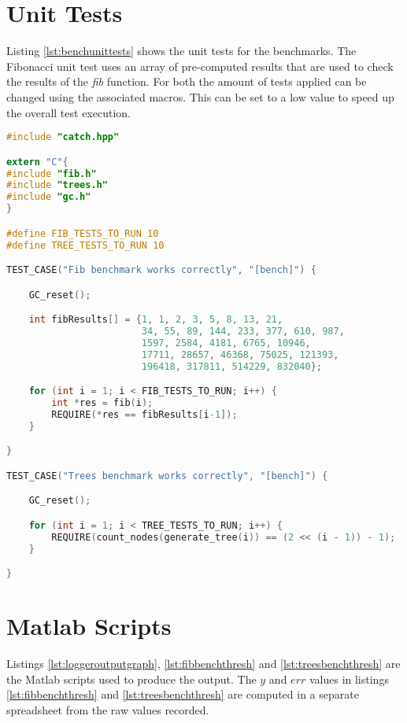 \documentclass[12pt,a4paper,twoside,openright]{report}
\begin{document}
\section{Unit Tests}

Listing \ref{lst:benchunittests} shows the unit tests for the benchmarks. The Fibonacci unit test uses an array of pre-computed results that are used to check the results of the \emph{fib} function. For both the amount of tests applied can be changed using the associated macros. This can be set to a low value to speed up the overall test execution.

\begin{figure*}
\begin{lstlisting}[language=C, caption=Benchmark unit tests, label={lst:benchunittests}]
#include "catch.hpp"

extern "C"{
#include "fib.h"
#include "trees.h"
#include "gc.h"
}

#define FIB_TESTS_TO_RUN 10
#define TREE_TESTS_TO_RUN 10

TEST_CASE("Fib benchmark works correctly", "[bench]") {

    GC_reset();

    int fibResults[] = {1, 1, 2, 3, 5, 8, 13, 21, 
                        34, 55, 89, 144, 233, 377, 610, 987,
                        1597, 2584, 4181, 6765, 10946, 
                        17711, 28657, 46368, 75025, 121393,
                        196418, 317811, 514229, 832040};

    for (int i = 1; i < FIB_TESTS_TO_RUN; i++) {
        int *res = fib(i);
        REQUIRE(*res == fibResults[i-1]);
    }

}

TEST_CASE("Trees benchmark works correctly", "[bench]") {

    GC_reset();

    for (int i = 1; i < TREE_TESTS_TO_RUN; i++) {
        REQUIRE(count_nodes(generate_tree(i)) == (2 << (i - 1)) - 1);
    }

}
\end{lstlisting}
\end{figure*}

\section{Matlab Scripts}

Listings \ref{lst:loggeroutputgraph}, \ref{lst:fibbenchthresh} and \ref{lst:treesbenchthresh} are the Matlab scripts used to produce the output. The $y$ and $err$ values in listings \ref{lst:fibbenchthresh} and \ref{lst:treesbenchthresh} are computed in a separate spreadsheet from the raw values recorded.
\end{document}
